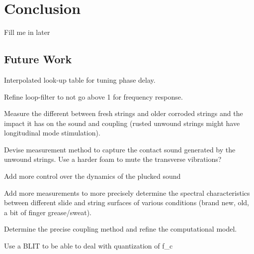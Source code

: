 \documentclass[../main.tex]{subfiles}
\begin{document}
\chapter{Conclusion}
Fill me in later

\section{Future Work}
Interpolated look-up table for tuning phase delay.

Refine loop-filter to not go above 1 for frequency response.

Measure the different between fresh strings and older corroded strings and the impact it has on the sound and coupling (rusted unwound strings might have longitudinal mode stimulation).

Devise measurement method to capture the contact sound generated by the unwound strings. Use a harder foam to mute the transverse vibrations?

Add more control over the dynamics of the plucked sound

Add more measurements to more precisely determine the spectral characteristics between different slide and string surfaces of various conditions (brand new, old, a bit of finger
grease/sweat).

Determine the precise coupling method and refine the computational model.

Use a BLIT to be able to deal with quantization of f_c
\end{document}

